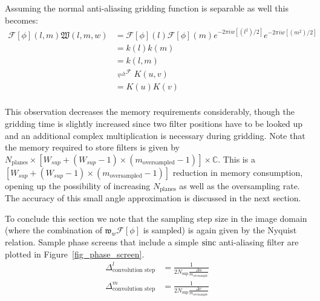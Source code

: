 Assuming the normal anti-aliasing gridding function is separable as well this becomes:
\begin{equation}
   \begin{split}
   \mathcal{F}[\phi](l,m)\mathfrak{W}(l,m,w) &= \mathcal{F}[\phi](l)\mathcal{F}[\phi](m)e^{-2{\pi}iw[(l^2)/2]}e^{-2{\pi}iw[(m^2)/2]}\\
                             &= k(l)k(m)\\
                             &= k(l,m)\\
                             &\rightleftharpoons^\mathcal{F} K(u,v)\\
                             &=K(u)K(v)\\
   \end{split}
\end{equation}

This observation decreases the memory requirements considerably, though the gridding time is slightly increased since two filter positions have to be looked up
and an additional complex multiplication is necessary during gridding. Note that the memory required to store filters is given by 
$N_{\text{planes}}\times[W_{sup} + (W_{sup} - 1)\times(m_{\text{oversampled}} - 1)]\times\mathbb{C}$. This is 
a $[W_{sup} + (W_{sup} - 1)\times(m_{\text{oversampled}} - 1)]$ reduction in memory consumption, opening up the possibility of increasing $N_{\text{planes}}$ as well
as the oversampling rate. The accuracy of this small angle approximation is discussed in the next section.

To conclude this section we note that the sampling step size in the image domain (where the combination of $\mathfrak{w}_w\mathcal{F}[\phi]$ is sampled) is again given
by the Nyquist relation. Sample phase screens that include a simple $\operatorname*{sinc}$ anti-aliasing filter are plotted in Figure~\ref{fig_phase_screen}.
\begin{equation}
 \begin{split}
  \Delta^l_{\text{convolution step}}&=\frac{1}{2N_{\text{sup}}\frac{\Delta{u}}{m_{\text{oversample}}}}\\
  \Delta^m_{\text{convolution step}}&=\frac{1}{2N_{\text{sup}}\frac{\Delta{v}}{m_{\text{oversample}}}}\\
 \end{split}
\end{equation}

